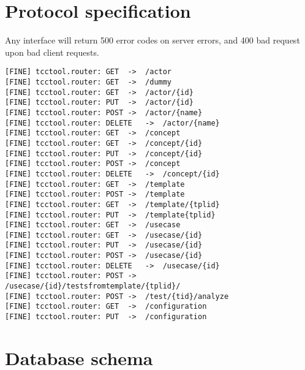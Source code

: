 


\chapter{Protocol specification}
Any interface will return 500 error codes on server errors, and 400 bad request upon bad client requests.
\begin{verbatim}
[FINE] tcctool.router: GET	->	/actor
[FINE] tcctool.router: GET	->	/dummy
[FINE] tcctool.router: GET	->	/actor/{id}
[FINE] tcctool.router: PUT	->	/actor/{id}
[FINE] tcctool.router: POST	->	/actor/{name}
[FINE] tcctool.router: DELETE	->	/actor/{name}
[FINE] tcctool.router: GET	->	/concept
[FINE] tcctool.router: GET	->	/concept/{id}
[FINE] tcctool.router: PUT	->	/concept/{id}
[FINE] tcctool.router: POST	->	/concept
[FINE] tcctool.router: DELETE	->	/concept/{id}
[FINE] tcctool.router: GET	->	/template
[FINE] tcctool.router: POST	->	/template
[FINE] tcctool.router: GET	->	/template/{tplid}
[FINE] tcctool.router: PUT	->	/template{tplid}
[FINE] tcctool.router: GET	->	/usecase
[FINE] tcctool.router: GET	->	/usecase/{id}
[FINE] tcctool.router: PUT	->	/usecase/{id}
[FINE] tcctool.router: POST	->	/usecase/{id}
[FINE] tcctool.router: DELETE	->	/usecase/{id}
[FINE] tcctool.router: POST	->	/usecase/{id}/testsfromtemplate/{tplid}/
[FINE] tcctool.router: POST	->	/test/{tid}/analyze
[FINE] tcctool.router: GET	->	/configuration
[FINE] tcctool.router: PUT	->	/configuration
\end{verbatim}

\chapter{Database schema}
